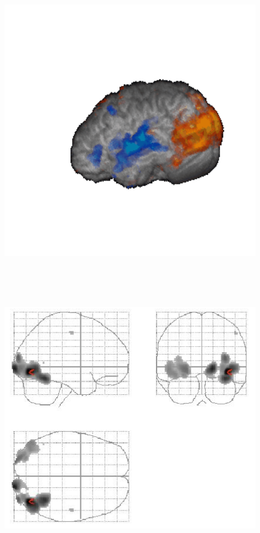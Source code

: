 \documentclass[final]{beamer}\usepackage{graphicx, color}
\begin{document}
\begin{frame}[fragile]
\begin{multicols}{2}
\begin{figure}
  \begin{minipage}[b]{3.5in}
    \includegraphics[width=7in, height=5in]{3d_proj.png}
  \end{minipage}\hfill
  \begin{minipage}[b]{3.5in}
    \includegraphics[width=7in, height=5in]{glass_brain.png}

\end{minipage}
\end{figure}
\end{multicols}
\end{frame}
\end{document}
